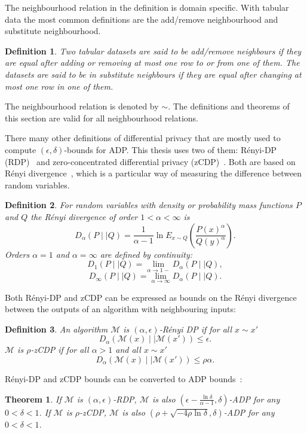 \documentclass[english,twoside,openright]{HYgraduMLDS}
\newtheorem{theorem}{Theorem}
\newtheorem{definition}{Definition}
\newcommand{\dmid}{\mid\mid}
\newcommand{\calm}{{\mathcal{M}}}
\begin{document}
The neighbourhood relation in the definition is domain specific. With tabular 
data the most common definitions are the add/remove neighbourhood and 
substitute neighbourhood.
\begin{definition}
    Two tabular datasets are said to be add/remove neighbours if they are equal 
    after adding or removing at most one row to or from one of them. The datasets 
    are said to be in substitute neighbours if they are equal after 
    changing at most one row in one of them.
\end{definition}
The neighbourhood relation is denoted by \(\sim\). The definitions and 
theorems of this section are valid for all neighbourhood relations.

There many other definitions of differential privacy that are mostly used
to compute \((\epsilon, \delta)\)-bounds for ADP. This thesis uses two of them: 
Rényi-DP (RDP)~\cite{Mironov17} and 
zero-concentrated differential privacy (zCDP)~\cite{BuS16}. Both are based 
on Rényi divergence~\cite{Mironov17}, which is a particular way of 
measuring the difference between random variables.

\begin{definition}
    For random variables with density or probability mass functions 
    \(P\) and \(Q\) the Rényi divergence of order 
    \(1 < \alpha < \infty\) is
    \[
        D_\alpha(P\dmid Q) = \frac{1}{\alpha - 1}\ln E_{x\sim Q}
        \left(\frac{P(x)^\alpha}{Q(y)^\alpha}\right).
    \]
    Orders \(\alpha = 1\) and \(\alpha = \infty\) are defined 
    by continuity:
    \[
        D_1(P\dmid Q) = \lim_{\alpha \to 1-} D_\alpha(P\dmid Q),
    \]
    \[
        D_\infty(P \dmid Q) = \lim_{\alpha\to \infty}D_\alpha(P\dmid Q).
    \]
\end{definition}

Both Rényi-DP and zCDP can be expressed as bounds on the 
Rényi divergence between the outputs of an algorithm with 
neighbouring inputs:

\begin{definition}
    An algorithm \(\calm\) is \((\alpha, \epsilon)\)-Rényi DP 
    if for all \(x \sim x'\)
    \[
        D_\alpha(\calm(x)\dmid \calm(x')) \leq \epsilon.
    \]
    \(\calm\) is \(\rho\)-zCDP if for all \(\alpha > 1\)
    and all \(x \sim x'\)
    \[
        D_\alpha(\calm(x)\dmid \calm(x')) \leq \rho \alpha.
    \]

\end{definition}

Rényi-DP and zCDP bounds can be converted to ADP bounds~\cite{Mironov17, BuS16}:
\begin{theorem}\label{other_dp_to_adp}
    If \(\calm\) is \((\alpha, \epsilon)\)-RDP, \(\calm\) is also 
    \((\epsilon - \frac{\ln \delta}{\alpha - 1}, \delta)\)-ADP for any 
    \(0 < \delta < 1\). If \(\calm\) is \(\rho\)-zCDP, \(\calm\) is also 
    \((\rho + \sqrt{-4\rho\ln \delta}, \delta)\)-ADP for any \(0 < \delta < 1\).
\end{theorem}
\end{document}
